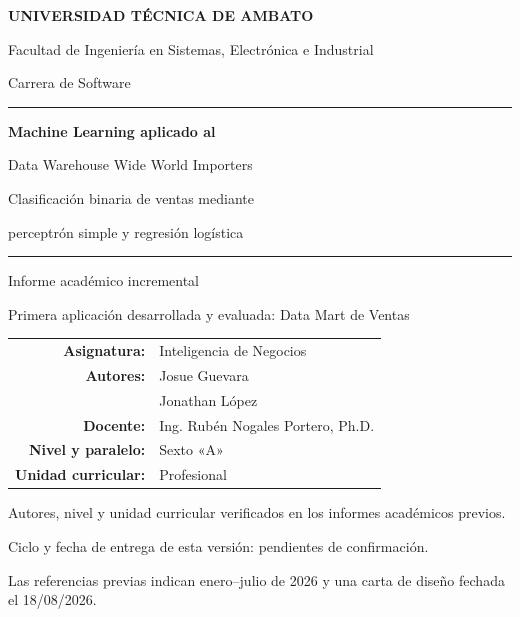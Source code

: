 \documentclass[11pt,a4paper]{article}
\begin{document}
\hypersetup{pageanchor=false}
\begin{titlepage}
\centering
{\Large\bfseries UNIVERSIDAD TÉCNICA DE AMBATO\par}
\vspace{0.4cm}
{\large Facultad de Ingeniería en Sistemas, Electrónica e Industrial\par}
{\large Carrera de Software\par}
\vspace{1.8cm}
\textcolor{blue!45!black}{\rule{\linewidth}{1.2pt}}\par
\vspace{0.6cm}
{\LARGE\bfseries Machine Learning aplicado al\par Data Warehouse Wide World Importers\par}
\vspace{0.6cm}
{\Large Clasificación binaria de ventas mediante\par perceptrón simple y regresión logística\par}
\vspace{0.6cm}
\textcolor{blue!45!black}{\rule{\linewidth}{1.2pt}}\par
\vspace{0.8cm}
{\large Informe académico incremental\par}
Primera aplicación desarrollada y evaluada: Data Mart de Ventas\par
\vspace{1cm}
\begin{tabular}{rl}
\textbf{Asignatura:} & Inteligencia de Negocios\\
\textbf{Autores:} & Josue Guevara\\ & Jonathan López\\
\textbf{Docente:} & Ing. Rubén Nogales Portero, Ph.D.\\
\textbf{Nivel y paralelo:} & Sexto «A»\\
\textbf{Unidad curricular:} & Profesional
\end{tabular}
\vfill
\small Autores, nivel y unidad curricular verificados en los informes académicos previos.\par
Ciclo y fecha de entrega de esta versión: pendientes de confirmación.\par
Las referencias previas indican enero--julio de 2026 y una carta de diseño fechada el 18/08/2026.\par
\end{titlepage}
\hypersetup{pageanchor=true}

\tableofcontents
\clearpage
\listoffigures
\clearpage
\listoftables
\clearpage
{}








\clearpage

\clearpage
\appendix

\end{document}
